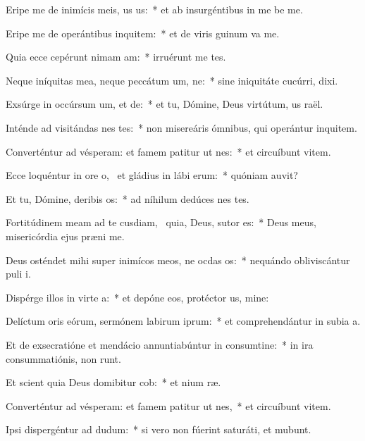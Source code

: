 \item Eripe me de inimícis meis, us us:~* et ab insurgéntibus in me be me.
\item Eripe me de operántibus inquitem:~* et de viris guinum va me.
\item Quia ecce cepérunt nimam am:~* irruérunt  me tes.
\item Neque iníquitas mea, neque peccátum um, ne:~* sine iniquitáte cucúrri,  dixi.
\item Exsúrge in occúrsum um, et de:~* et tu, Dómine, Deus virtútum, us raël.
\item Inténde ad visitándas nes tes:~* non misereáris ómnibus, qui operántur inquitem.
\item Converténtur ad vésperam: et famem patitur ut nes:~* et circuíbunt vitem.
\item Ecce loquéntur in ore o,~\pscross{} et gládius in lábi erum:~* quóniam  auvit?
\item Et tu, Dómine, deribis os:~* ad níhilum dedúces nes tes.
\item Fortitúdinem meam ad te cusdiam,~\pscross{} quia, Deus, sutor  es:~* Deus meus, misericórdia ejus præni me.
\item Deus osténdet mihi super inimícos meos, ne ocdas os:~* nequándo obliviscántur puli i.
\item Dispérge illos in virte a:~* et depóne eos, protéctor us, mine:
\item Delíctum oris eórum, sermónem labirum iprum:~* et comprehendántur in subia a.
\item Et de exsecratióne et mendácio annuntiabúntur in consumtine:~* in ira consummatiónis,  non runt.
\item Et scient quia Deus domibitur cob:~* et nium ræ.
\item Converténtur ad vésperam: et famem patitur ut nes,~* et circuíbunt vitem.
\item Ipsi dispergéntur ad dudum:~* si vero non fúerint saturáti, et mubunt.
